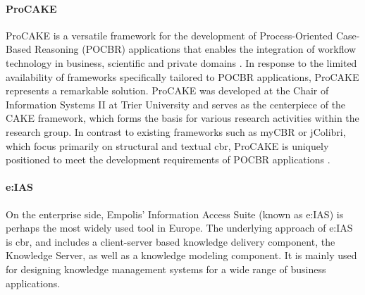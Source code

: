         
            \paragraph{ProCAKE}
            ProCAKE is a versatile framework for the development of Process-Oriented Case-Based Reasoning (POCBR) applications that enables the integration of workflow technology in business, scientific and private domains \cite{bergmann2019procake}. In response to the limited availability of frameworks specifically tailored to POCBR applications, ProCAKE represents a remarkable solution. ProCAKE was developed at the Chair of Information Systems II at Trier University and serves as the centerpiece of the CAKE framework, which forms the basis for various research activities within the research group. In contrast to existing frameworks such as myCBR or jColibri, which focus primarily on structural and textual \acrshort{cbr}, ProCAKE is uniquely positioned to meet the development requirements of POCBR applications \cite{bergmann2019procake, bergmann2014collaborative}.


            \paragraph{e:IAS}
            On the enterprise side, Empolis' Information Access Suite (known as e:IAS) \cite{hanft2008realising} is perhaps the most widely used tool in Europe. The underlying approach of e:IAS is \acrshort{cbr}, and includes a client-server based knowledge delivery component, the Knowledge Server, as well as a knowledge modeling component. It is mainly used for designing knowledge management systems for a wide range of business applications.
